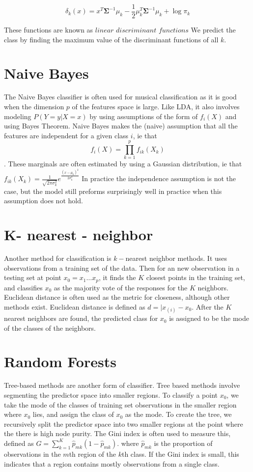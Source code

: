 \documentclass[12pt,twoside]{reedthesis}
\theoremstyle{definition}
\theoremstyle{definition}
\theoremstyle{definition}
\theoremstyle{remark}
\begin{document}
\[ \delta_k(x) = x^T\mathbf{\Sigma}^{-1}\mu_k - \frac{1}{2}\mu_k^T\mathbf{\Sigma}^{-1}\mu_k + \log \pi_k \]

These functions are known as \(\textit{linear discriminant functions}\)
We predict the class by finding the maximum value of the discriminant
functions of all \(k\).

\section{Naive Bayes}\label{naive-bayes}

The Naive Bayes classifier is often used for musical classification as
it is good when the dimension \(p\) of the features space is large. Like
LDA, it also involves modeling \(P(Y = y | X =x)\) by using assumptions
of the form of \(f_i(X)\) and using Bayes Theorem. Naive Bayes makes the
(naive) assumption that all the features are independent for a given
class \(i\), ie that \[f_i(X) = \prod_{k = 1}^p f_{ik}(X_k)\]. These
marginals are often estimated by using a Gaussian distribution, ie that
\(f_{ik}(X_k) = \frac{1}{\sqrt{2\pi\sigma_k^2}}e^{\frac{(x - \mu_k)^2}{2\sigma_k^2}}\)
In practice the independence assumption is not the case, but the model
still preforms surprisingly well in practice when this assumption does
not hold.

\section{K- nearest - neighbor}\label{k--nearest---neighbor}

Another method for classification is \(k-\)nearest neighbor methods. It
uses observations from a training set of the data. Then for an new
observation in a testing set at point \(x_0 = x_1 \ldots x_p\), it finds
the \(K\) closest points in the training set, and classifies \(x_0\) as
the majority vote of the responses for the \(K\) neighbors. Euclidean
distance is often used as the metric for closeness, although other
methods exist. Euclidean distance is defined as \(d = |x_{(i)} - x_0\).
After the \(K\) nearest neighbors are found, the predicted class for
\(x_0\) is assigned to be the mode of the classes of the neighbors.

\section{Random Forests}\label{random-forests}

Tree-based methods are another form of classifier. Tree based methods
involve segmenting the predictor space into smaller regions. To classify
a point \(x_0\), we take the mode of the classes of training set
observations in the smaller region where \(x_0\) lies, and assign the
class of \(x_0\) as the mode. To create the tree, we recursively split
the predictor space into two smaller regions at the point where the
there is high node purity. The Gini index is often used to measure this,
defined as \(G = \sum_{k = 1}^K \hat{p}_{mk}(1 - \hat{p}_{mk})\). where
\(\hat{p}_{mk}\) is the proportion of observations in the \(m\)th region
of the \(k\)th class. If the Gini index is small, this indicates that a
region contains mostly observations from a single class.
\end{document}
